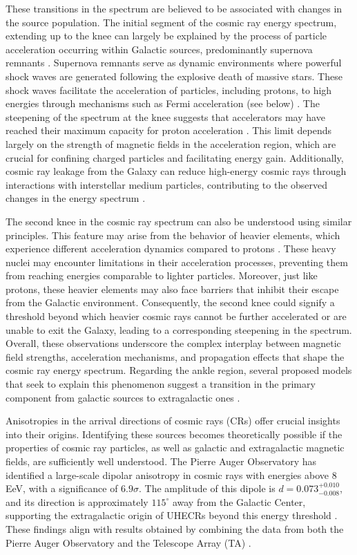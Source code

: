 These transitions in the spectrum are believed to be associated with changes in the source population. The initial segment of the cosmic ray energy spectrum, extending up to the knee can largely be explained by the process of particle acceleration occurring within Galactic sources, predominantly supernova remnants . Supernova remnants serve as dynamic environments where powerful shock waves are generated following the explosive death of massive stars. These shock waves facilitate the acceleration of particles, including protons, to high energies through mechanisms such as Fermi acceleration (see below) . The steepening of the spectrum at the knee suggests that accelerators may have reached their maximum capacity for proton acceleration  . This limit depends largely on the strength of magnetic fields in the acceleration region, which are crucial for confining charged particles and facilitating energy gain. Additionally, cosmic ray leakage from the Galaxy can reduce high-energy cosmic rays through interactions with interstellar medium particles, contributing to the observed changes in the energy spectrum . 

The second knee in the cosmic ray spectrum can also be understood using similar principles. This feature may arise from the behavior of heavier elements, which experience different acceleration dynamics compared to protons . These heavy nuclei may encounter limitations in their acceleration processes, preventing them from reaching energies comparable to lighter particles. Moreover, just like protons, these heavier elements may also face barriers that inhibit their escape from the Galactic environment. Consequently, the second knee could signify a threshold beyond which heavier cosmic rays cannot be further accelerated or are unable to exit the Galaxy, leading to a corresponding steepening in the spectrum. Overall, these observations underscore the complex interplay between magnetic field strengths,  acceleration mechanisms, and propagation effects that shape the cosmic ray energy spectrum. Regarding the ankle region, several proposed models that seek to explain this phenomenon suggest a transition in the primary component from galactic sources to extragalactic ones .

Anisotropies in the arrival directions of cosmic rays (CRs) offer crucial insights into their origins. Identifying these sources becomes theoretically possible if the properties of cosmic ray particles, as well as galactic and extragalactic magnetic fields, are sufficiently well understood. The Pierre Auger Observatory has identified a large-scale dipolar anisotropy in cosmic rays with energies above 8 EeV, with a significance of $6.9\sigma$. The amplitude of this dipole is $d = 0.073^{+0.010}_{-0.008}$, and its direction is approximately $115^\circ$ away from the Galactic Center, supporting the extragalactic origin of UHECRs beyond this energy threshold . These findings align with results obtained by combining the data from both the Pierre Auger Observatory and the Telescope Array (TA) .

